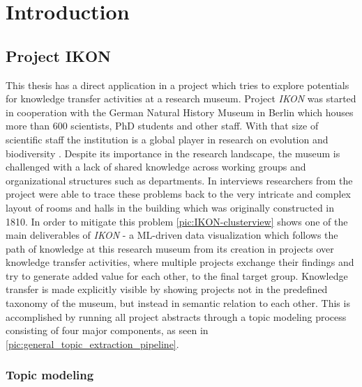 %
\chapter{Introduction}
\label{chap:introduction}

\section{Project IKON}

This thesis has a direct application in a project which tries to explore potentials for knowledge transfer activities at a research museum. Project \textit{IKON} was started in cooperation with the German Natural History Museum in Berlin which houses more than 600  scientists, PhD students and other staff. With that size of scientific staff the institution is a global player in research on evolution and biodiversity \cite{IntroducingMuseumFur}. Despite its importance in the research landscape, the museum is challenged with a lack of shared knowledge across working groups and organizational structures such as departments. In interviews researchers from the project were able to trace these problems back to the very intricate and complex layout of rooms and halls in the building which was originally constructed in 1810. In order to mitigate this problem \autoref{pic:IKON-clusterview} shows one of the main deliverables of \textit{IKON} - a ML-driven data visualization which follows the path of knowledge at this research museum from its creation in projects over knowledge transfer activities, where multiple projects exchange their findings and try to generate added value for each other, to the final target group. Knowledge transfer is made explicitly visible by showing projects not in the predefined taxonomy of the museum, but instead in semantic relation to each other. This is accomplished by running all project abstracts through a topic modeling process consisting of four major components, as seen in \autoref{pic:general_topic_extraction_pipeline}. 

\subsection{Topic modeling}

